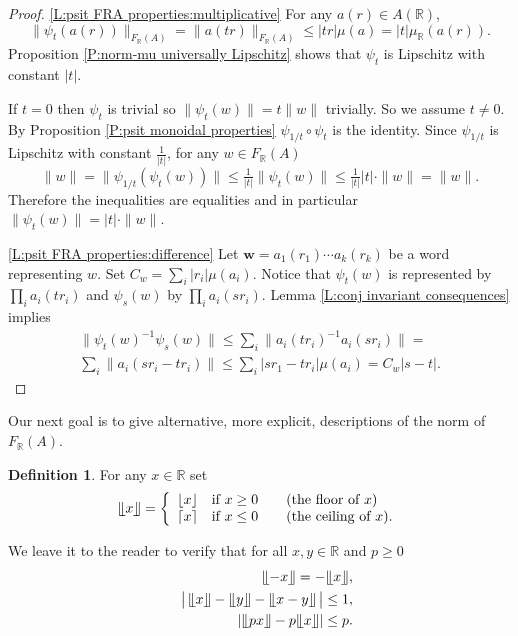 \documentclass[12pt]{amsart}
\theoremstyle{definition}
\newtheorem{defn}[prop]{Definition}
\def\RR{\ensuremath{\mathbb{R}}}
\newcommand{\B}[1]{\mathbf{#1}}
\def\Free{F}
\newcommand{\myfloor}[1]{\llfloor #1 \rrfloor}
\begin{document}
\begin{proof}
\ref{L:psit FRA properties:multiplicative}
For any $a(r) \in A(\RR)$,
\[
\| \psi_t(a(r))\|_{\Free_\RR(A)} =
\| a(tr)\|_{\Free_\RR(A)} \leq 
|tr| \mu(a) =
|t| \mu_\RR(a(r)).
\] 
Proposition \ref{P:norm-mu universally Lipschitz} shows that $\psi_t$ is Lipschitz with constant $|t|$.

If $t=0$ then $\psi_t$ is trivial so $\| \psi_t(w)\|=t\|w\|$ trivially.
So we assume $t \neq 0$.
By Proposition \ref{P:psit monoidal properties} $\psi_{1/t} \circ \psi_t$ is the identity.
Since $\psi_{1/t}$ is Lipschitz with constant $\tfrac{1}{|t|}$, for any $w \in\Free_\RR(A)$
\[
\|w\| = \| \psi_{1/t}(\psi_t(w))\| \leq \tfrac{1}{|t|} \| \psi_t(w)\| \leq \tfrac{1}{|t|}|t| \cdot \|w\| = \| w\|.
\]
Therefore the inequalities are equalities and in particular $\|\psi_t(w)\|=|t| \cdot \|w\|$.


\smallskip
\noindent
\ref{L:psit FRA properties:difference}
Let $\B w=a_1(r_1) \cdots a_k(r_k)$ be a word representing $w$.
Set $C_w=\sum_i |r_i| \mu(a_i)$.
Notice that $\psi_t(w)$ is represented by $\prod_i a_i(tr_i)$ and $\psi_s(w)$ by $\prod_i a_i(sr_i)$.
Lemma \ref{L:conj invariant consequences} implies
\begin{multline*}
\| \psi_t(w)^{-1} \psi_s(w)\| \leq \sum_i \| a_i(tr_i)^{-1}a_i(sr_i)\| =
\\
\sum_i \| a_i(sr_i-tr_i)\| \leq 
\sum_i |sr_1-tr_i| \mu(a_i) = C_w|s-t|.
\end{multline*}
\end{proof}













Our next goal is to give alternative, more explicit, descriptions of the norm of $\Free_\RR(A)$.





\begin{defn}
For any $x \in \RR$ set
\[
\myfloor{x} =\left\{
\begin{array}{ll}
\lfloor x \rfloor & \text{if $x \geq 0$\qquad  (the floor of $x$)} \\
\lceil x \rceil & \text{if $x \leq 0$\qquad  (the ceiling of $x$).} 
\end{array}\right.
\]
\end{defn}


We leave it to the reader to verify that for all $x,y\in \RR$ and $p\geq 0$
\begin{eqnarray}
\label{E:myfloor idendities}
\nonumber
&& \myfloor{-x} = - \myfloor{x}, \\
&& \big| \, \myfloor{x} - \myfloor{y} - \myfloor{x-y} \, \big| \leq 1, \\
\nonumber
&& \left| \myfloor{px} - p \myfloor{x}\right| \leq p .
\end{eqnarray}
\end{document}
